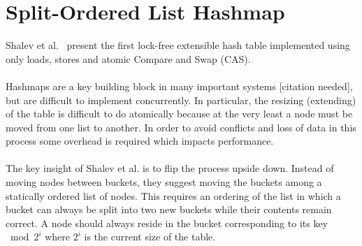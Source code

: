 \documentclass{uit-thesis}
\begin{document}
\section{Split-Ordered List Hashmap}\label{sec:hashmap}
Shalev et al.~\cite{Shalev2006} present the first lock-free extensible hash table implemented using only loads, stores and atomic Compare and Swap (CAS).
\\\\
Hashmaps are a key building block in many important systems [citation needed], but are difficult to implement concurrently. In particular, the resizing (extending) of the table is difficult to do atomically because at the very least a node must be moved from one list to another. In order to avoid conflicts and loss of data in this process some overhead is required which impacts performance.
\\\\
The key insight of Shalev et al. is to flip the process upside down. Instead of moving nodes between buckets, they suggest moving the buckets among a statically ordered list of nodes. This requires an ordering of the list in which a bucket can always be split into two new buckets while their contents remain correct. A node should always reside in the bucket corresponding to its key $\bmod{2^i}$ where $2^i$ is the current size of the table.
\end{document}

